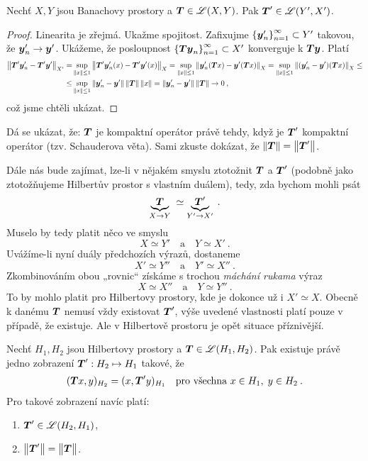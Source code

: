 \begin{lemma}
Nechť $X,Y$ jsou Banachovy prostory a $\boldsymbol{T} \in \mathscr{L} (X,Y)$. Pak $\boldsymbol{T}' \in \mathscr{L}(Y', X')$.
\end{lemma}
\begin{proof}
Linearita je zřejmá. Ukažme spojitost.  Zafixujme $\left \lbrace \boldsymbol{y}'_n \right \rbrace_{n=1}^\infty \subset Y'$ takovou, že $\boldsymbol{y}'_n \rightarrow \boldsymbol{y}'$. Ukážeme, že posloupnost $\left \lbrace \boldsymbol{T} \boldsymbol{y}_n \right \rbrace_{n=1}^\infty \subset X'$ konverguje k $\boldsymbol{T} \boldsymbol{y}$. Platí
\begin{align*}
    \left\lVert\boldsymbol{T}' \boldsymbol{y}'_n - \boldsymbol{T}' \boldsymbol{y}'\right\rVert_{X'} 
    =&
    \sup_{\left\lVert x\right\rVert \leq 1} \left\lVert\boldsymbol{T}' \boldsymbol{y}'_n (x)- \boldsymbol{T}' \boldsymbol{y}' (x)\right\rVert_X 
    =
    \sup_{\left\lVert x\right\rVert \leq 1} \left\lVert\boldsymbol{y}'_n  (\boldsymbol{T} x)- \boldsymbol{y}' (\boldsymbol{T} x)\right\rVert_X 
    =
    \sup_{\left\lVert x\right\rVert \leq 1} \left\lVert(\boldsymbol{y}'_n-\boldsymbol{y}') (\boldsymbol{T} x)\right\rVert_X 
    \leq \\
    \leq&
     \sup_{\left\lVert x\right\rVert \leq 1} \left\lVert\boldsymbol{y}'_n - \boldsymbol{y}'\right\rVert \left\lVert\boldsymbol{T}\right\rVert \left\lVert x\right\rVert
    =
    \left\lVert\boldsymbol{y}'_n -\boldsymbol{y}'\right\rVert \left\lVert\boldsymbol{T}\right\rVert \rightarrow 0\:,
\end{align*}
což jsme chtěli ukázat.
\end{proof}
\begin{remark}
Dá se ukázat, že: $\boldsymbol{T}$ je kompaktní operátor právě tehdy, když je $\boldsymbol{T}'$ kompaktní operátor (tzv. Schauderova věta). Sami zkuste dokázat, že $\left\lVert\boldsymbol{T}\right\rVert = \left\lVert\boldsymbol{T}'\right\rVert$.
\end{remark}

\bigskip

Dále nás bude zajímat, lze-li v nějakém smyslu ztotožnit $\boldsymbol{T}$ a $\boldsymbol{T}'$ (podobně jako ztotožňujeme Hilbertův prostor s vlastním duálem), tedy, zda bychom mohli psát
$$
    \underbrace{\boldsymbol{T}}_{X \to Y} \;\simeq \underbrace{\boldsymbol{T}'}_{Y' \to X'} \:.
$$
Muselo by tedy platit něco ve smyslu
$$ X \simeq Y' \quad \text{a} \quad Y \simeq X' \: . $$
Uvážíme-li nyní duály předchozích výrazů, dostaneme
$$ X' \simeq Y'' \quad \text{a} \quad Y' \simeq X'' \: . $$
Zkombinováním obou „rovnic“ získáme s trochou \textit{máchání rukama} výraz
$$ X \simeq X'' \quad \text{a} \quad Y \simeq Y'' \: . $$
To by mohlo platit pro Hilbertovy prostory, kde je dokonce už i $X' \simeq X$. Obecně k danému $\boldsymbol{T}$ nemusí vždy existovat $\boldsymbol{T}'$, výše uvedené vlastnosti platí pouze v případě, že existuje. Ale v  Hilbertově prostoru je opět situace příznivější.

\begin{theorem}
Nechť $H_1, H_2$ jsou Hilbertovy prostory a $\boldsymbol{T} \in \mathscr{L}(H_1, H_2)$. Pak existuje právě jedno zobrazení $\boldsymbol{T}' : H_2 \mapsto H_1$ takové, že 
\begin{align} \label{eq4.dualHilbert}
    (\boldsymbol{T} x, y)_{H_2} = (x, \boldsymbol{T}'y)_{H_1} \quad \text{pro všechna } x \in H_1, \; y \in H_2 \:.
\end{align}
Pro takové zobrazení navíc platí: \begin{enumerate}
    \item $\boldsymbol{T}' \in \mathscr{L}(H_2, H_1)$,
    \item $\norm{\map T'} = \norm{\map T \vph{\map T'}}$.
\end{enumerate}
\end{theorem}

